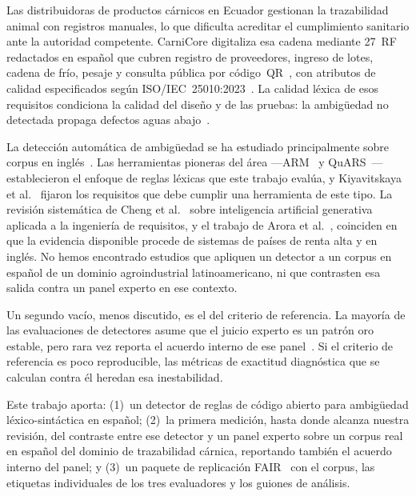 \documentclass[runningheads]{llncs}
\begin{document}
Las distribuidoras de productos cárnicos en Ecuador gestionan la trazabilidad
animal con registros manuales, lo que dificulta acreditar el cumplimiento
sanitario ante la autoridad competente. CarniCore digitaliza esa cadena
mediante 27~RF redactados en español que cubren registro de proveedores,
ingreso de lotes, cadena de frío, pesaje y consulta pública por
código~QR~\cite{iso29148}, con atributos de calidad especificados según
ISO/IEC~25010:2023~\cite{iso25010}. La calidad léxica de esos requisitos condiciona la
calidad del diseño y de las pruebas: la ambigüedad no detectada propaga
defectos aguas abajo~\cite{mendez2017naming,mendez2015naming}.

La detección automática de ambigüedad se ha estudiado principalmente sobre
corpus en inglés~\cite{ferrari2019nlp,femmer2017smells,gervasi2019ambiguity,%
berry2003ambiguity}. Las herramientas pioneras del área
---ARM~\cite{wilson1997automated} y QuARS~\cite{fabbrini2001linguistic}---
establecieron el enfoque de reglas léxicas que este trabajo evalúa, y
Kiyavitskaya et al.~\cite{kiyavitskaya2008} fijaron los requisitos que debe
cumplir una herramienta de este tipo. La revisión sistemática de Cheng et
al.~\cite{cheng2026genai} sobre inteligencia artificial generativa aplicada a
la ingeniería de requisitos, y el trabajo de Arora et
al.~\cite{arora2024genai}, coinciden en que la evidencia disponible procede de
sistemas de países de renta alta y en inglés. No hemos encontrado estudios que
apliquen un detector a un corpus en español de un dominio agroindustrial
latinoamericano, ni que contrasten esa salida contra un panel experto en ese
contexto.

Un segundo vacío, menos discutido, es el del criterio de referencia. La mayoría
de las evaluaciones de detectores asume que el juicio experto es un patrón oro
estable, pero rara vez reporta el acuerdo interno de ese
panel~\cite{jorgensen2004,shepperd2014researcher}. Si el criterio de referencia
es poco reproducible, las métricas de exactitud diagnóstica que se calculan
contra él heredan esa inestabilidad.

Este trabajo aporta: (1)~un detector de reglas de código abierto para
ambigüedad léxico-sintáctica en español; (2)~la primera medición, hasta donde
alcanza nuestra revisión, del contraste entre ese detector y un panel experto
sobre un corpus real en español del dominio de trazabilidad cárnica,
reportando también el acuerdo interno del panel; y (3)~un paquete de
replicación FAIR~\cite{wilkinson2016fair} con el corpus, las etiquetas
individuales de los tres evaluadores y los guiones de análisis.
\end{document}
